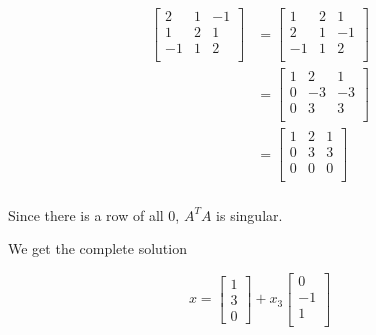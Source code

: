 \documentclass[12pt,letterpaper]{article}
\begin{document}
\begin{enumerate}[label=\S 2.\arabic*]
\begin{enumerate}
          \begin{align*}
            \begin{bmatrix}
               2 & 1 & -1 \\
               1 & 2 &  1 \\
              -1 & 1 &  2 \\
            \end{bmatrix}
            &=
            \begin{bmatrix}
               1 & 2 &  1 \\
               2 & 1 & -1 \\
              -1 & 1 &  2 \\
            \end{bmatrix}
            \\
            &=
            \begin{bmatrix}
               1 &  2 &  1 \\
               0 & -3 & -3 \\
               0 &  3 &  3 \\
            \end{bmatrix}
            \\
            &=
            \begin{bmatrix}
               1 &  2 &  1 \\
               0 &  3 &  3 \\
               0 &  0 &  0 \\
            \end{bmatrix}
            \\
          \end{align*}

          Since there is a row of all 0, $A^TA$ is singular.

          We get the complete solution

          \[
            x
            =
            \begin{bmatrix}
              1 \\
              3 \\
              0
            \end{bmatrix}
            +
            x_3
            \begin{bmatrix}
               0 \\
              -1 \\
               1 \\
            \end{bmatrix}
          \]


\end{enumerate}
\end{enumerate}
\end{document}
